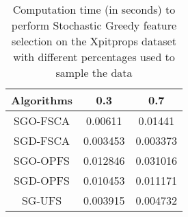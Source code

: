 \begin{table}
	\begin{center}
		\begin{tabular}{c c c}
			Algorithms & 0.3 & 0.7 \\
			\hline
			SGO-FSCA & 0.00611 & 0.01441 \\
			SGD-FSCA & 0.003453 & 0.003373 \\
			SGO-OPFS & 0.012846 & 0.031016 \\
			SGD-OPFS & 0.010453 & 0.011171 \\
			SG-UFS & 0.003915 & 0.004732 \\
		\end{tabular}
	\end{center}
	\caption{Computation time (in seconds) to perform Stochastic Greedy feature selection on the Xpitprops dataset with different percentages used to sample the data}
\end{table}